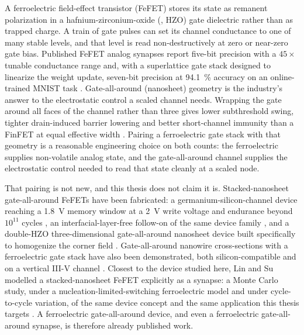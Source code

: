A ferroelectric field-effect transistor (FeFET) stores its state as remanent
polarization in a hafnium-zirconium-oxide (, HZO) gate
dielectric rather than as trapped charge. A train of gate pulses can set its channel
conductance to one of many stable levels, and that level is read non-destructively
at zero or near-zero gate bias. Published FeFET analog synapses report five-bit
precision with a $45\times$ tunable conductance range \cite{Jerry2017_IEDM} and,
with a superlattice gate stack designed to linearize the weight update, seven-bit
precision at \SI{94.1}{\percent} accuracy on an online-trained MNIST task
\cite{Aabrar2022_TED}. Gate-all-around (nanosheet) geometry is the industry's answer
to the electrostatic control a scaled channel needs. Wrapping the gate around all
faces of the channel rather than three gives lower subthreshold swing, tighter
drain-induced barrier lowering and better short-channel immunity than a FinFET at
equal effective width
\cite{Panigrahy2024_IEEEAccess,Sreenivasulu2024_IEEEAccess}. Pairing a ferroelectric
gate stack with that geometry is a reasonable engineering choice on both counts: the
ferroelectric supplies non-volatile analog state, and the gate-all-around channel
supplies the electrostatic control needed to read that state cleanly at a scaled
node.

That pairing is not new, and this thesis does not claim it is. Stacked-nanosheet
gate-all-around FeFETs have been fabricated: a germanium-silicon-channel device
reaching a \SI{1.8}{\volt} memory window at a \SI{2}{\volt} write voltage and
endurance beyond $10^{11}$ cycles \cite{Chen2023_VLSI}, an interfacial-layer-free
follow-on of the same device family \cite{Hsieh2024_TED}, and a double-HZO
three-dimensional gate-all-around nanosheet device built specifically to homogenize
the corner field \cite{Liao2022_VLSI}. Gate-all-around nanowire cross-sections with a
ferroelectric gate stack have also been demonstrated, both silicon-compatible
\cite{Lee2021_JEDS} and on a vertical III-V channel \cite{Persson2022_EDL}. Closest to
the device studied here, Lin and Su modelled a stacked-nanosheet FeFET explicitly as
a synapse: a Monte Carlo study, under a nucleation-limited-switching ferroelectric
model and under cycle-to-cycle variation, of the same device concept and the same
application this thesis targets \cite{Lin2024_OJNano,Lin2023_SNW}. A ferroelectric
gate-all-around device, and even a ferroelectric gate-all-around synapse, is
therefore already published work.

